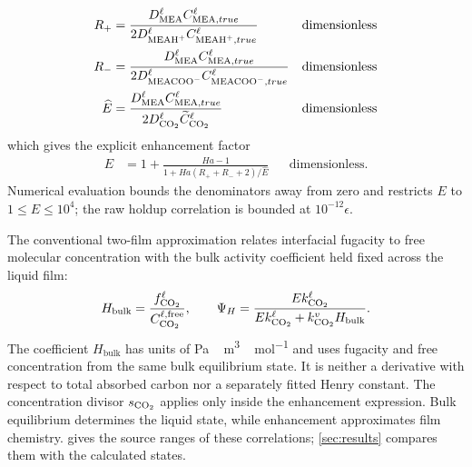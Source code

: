 \begin{align}
R_+ &= \frac{D^{\liq}_{\MEA} C^{\liq}_{\MEA,true}}
{2D^{\liq}_{\MEAH} C^{\liq}_{\MEAH,true}}
&& \text{dimensionless}\\
R_- &= \frac{D^{\liq}_{\MEA} C^{\liq}_{\MEA,true}}
{2D^{\liq}_{\MEACOO} C^{\liq}_{\MEACOO,true}}
&& \text{dimensionless}\\
\widehat{E} &= \frac{D^{\liq}_{\MEA} C^{\liq}_{\MEA,true}}
{2D^{\liq}_{\COtwo} \widetilde C^{\liq}_{\COtwo}}
&& \text{dimensionless}
\end{align}
which gives the explicit enhancement factor
\begin{align}
E &= 1+\frac{Ha-1}{1 + Ha(R_+ + R_- + 2)/\widehat{E}}
&& \text{dimensionless}.
\end{align}
Numerical evaluation bounds the denominators away from zero and restricts $E$ to $1\leq E\leq10^4$; the raw holdup correlation is bounded at \(10^{-12}\epsilon\).

The conventional two-film approximation relates interfacial fugacity to free molecular concentration with the bulk activity coefficient held fixed across the liquid film:
\begin{equation}
H_{\mathrm{bulk}}=\frac{f^{\ell}_{\COtwo}}{C^{\ell,\mathrm{free}}_{\COtwo}},
\qquad \Psi_H=\frac{E k^{\ell}_{\COtwo}}{E k^{\ell}_{\COtwo}+k^{v}_{\COtwo}H_{\mathrm{bulk}}}.
\end{equation}
The coefficient $H_{\mathrm{bulk}}$ has units of \unit{Pa\,m^3\,mol^{-1}} and uses fugacity and free \COtwo{} concentration from the same bulk equilibrium state.
It is neither a derivative with respect to total absorbed carbon nor a separately fitted Henry constant.
The concentration divisor $s_{\COtwo}$ applies only inside the enhancement expression.
Bulk equilibrium determines the liquid state, while enhancement approximates film chemistry.
 gives the source ranges of these correlations; \cref{sec:results} compares them with the calculated states.

